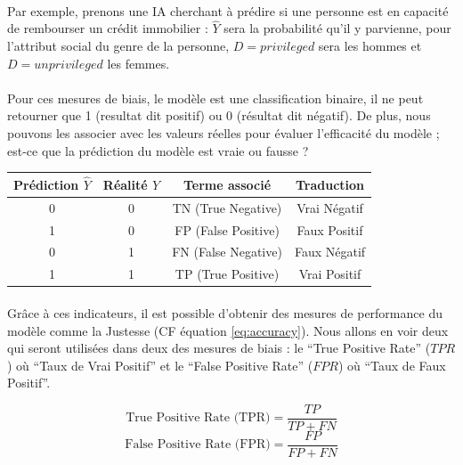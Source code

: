 \documentclass[10pt, french, a4paper]{report}
\begin{document}
\paragraph{}
Par exemple, prenons une IA cherchant à prédire si une personne est en capacité de rembourser un crédit immobilier : $\hat{Y}$ sera la probabilité qu'il y parvienne, pour l'attribut social du genre de la personne, $D = privileged$ sera les hommes et $D = unprivileged$ les femmes.

\paragraph{}
Pour ces mesures de biais, le modèle est une classification binaire, il ne peut retourner que 1 (resultat dit positif) ou 0 (résultat dit négatif). De plus, nous pouvons les associer avec les valeurs réelles pour évaluer l'efficacité du modèle ; est-ce que la prédiction du modèle est vraie ou fausse ?

\begin{center}
  \begin{tabular}{ |c|c|c|c| } 
   \hline
   Prédiction $\hat{Y}$ & Réalité $Y$ & Terme associé & Traduction \\ 
   \hline
   0 & 0 & TN (True Negative) & Vrai Négatif \\ 
   1 & 0 & FP (False Positive) & Faux Positif \\ 
   0 & 1 & FN (False Negative) & Faux Négatif \\ 
   1 & 1 & TP (True Positive) & Vrai Positif \\ 
   \hline
  \end{tabular}
\end{center}

\paragraph{}
Grâce à ces indicateurs, il est possible d'obtenir des mesures de performance du modèle comme la Justesse (CF équation \ref{eq:accuracy}). Nous allons en voir deux qui seront utilisées dans deux des mesures de biais : le ``True Positive Rate'' ($TPR$) où ``Taux de Vrai Positif'' et le ``False Positive Rate'' ($FPR$) où ``Taux de Faux Positif''.

\begin{equation}\label{eq:tpr}
  \text{True Positive Rate (TPR)} = \frac{TP}{TP + FN}
\end{equation}
\begin{equation}\label{eq:tpr}
  \text{False Positive Rate (FPR)} = \frac{FP}{FP + FN}
\end{equation}
\end{document}
